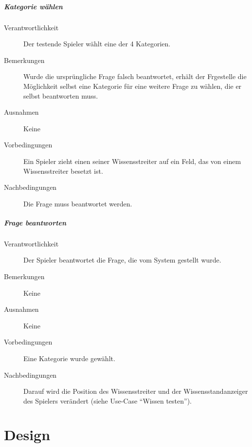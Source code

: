 \documentclass{report}
\begin{document}
\paragraph{Kategorie wählen}
\begin{description}
	\item[Verantwortlichkeit] Der testende Spieler wählt eine der 4 Kategorien.
	\item[Bemerkungen] Wurde die ursprüngliche Frage falsch beantwortet, erhält der Frgestelle die Möglichkeit selbst eine Kategorie für eine weitere Frage zu wählen, die er selbst beantworten muss.
	\item[Ausnahmen] Keine
	\item[Vorbedingungen] Ein Spieler zieht einen seiner Wissensstreiter auf ein Feld, das von einem Wissensstreiter besetzt ist.
	\item[Nachbedingungen] Die Frage muss beantwortet werden.
\end{description}

\paragraph{Frage beantworten}
\begin{description}
	\item[Verantwortlichkeit] Der Spieler beantwortet die Frage, die vom System gestellt wurde.
	\item[Bemerkungen] Keine
	\item[Ausnahmen] Keine
	\item[Vorbedingungen] Eine Kategorie wurde gewählt.
	\item[Nachbedingungen] Darauf wird die Position des Wissensstreiter und der Wissensstandanzeiger des Spielers verändert (siehe Use-Case "`Wissen testen"').
\end{description}

\chapter{Design}
\end{document}
